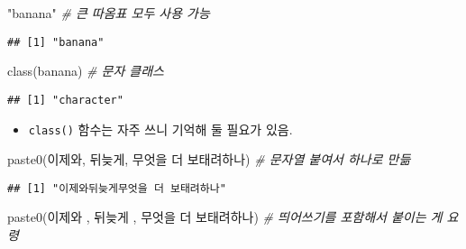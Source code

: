 \documentclass[
  12,
]{article}
\newenvironment{Shaded}{\begin{snugshade}}{\end{snugshade}}
\newcommand{\CommentTok}[1]{\textcolor[rgb]{0.56,0.35,0.01}{\textit{#1}}}
\newcommand{\FunctionTok}[1]{\textcolor[rgb]{0.00,0.00,0.00}{#1}}
\newcommand{\NormalTok}[1]{#1}
\newcommand{\StringTok}[1]{\textcolor[rgb]{0.31,0.60,0.02}{#1}}
\providecommand{\tightlist}{%
  \setlength{\itemsep}{0pt}\setlength{\parskip}{0pt}}
\begin{document}
\begin{Shaded}
\begin{Highlighting}[]
\StringTok{"banana"} \CommentTok{\# 큰 따옴표 모두 사용 가능}
\end{Highlighting}
\end{Shaded}

\begin{verbatim}
## [1] "banana"
\end{verbatim}

\begin{Shaded}
\begin{Highlighting}[]
\FunctionTok{class}\NormalTok{(}\StringTok{\textquotesingle{}banana\textquotesingle{}}\NormalTok{) }\CommentTok{\# 문자 클래스}
\end{Highlighting}
\end{Shaded}

\begin{verbatim}
## [1] "character"
\end{verbatim}

\begin{itemize}
\tightlist
\item
  \texttt{class()} 함수는 자주 쓰니 기억해 둘 필요가 있음.
\end{itemize}

\begin{Shaded}
\begin{Highlighting}[]
\FunctionTok{paste0}\NormalTok{(}\StringTok{\textquotesingle{}이제와\textquotesingle{}}\NormalTok{, }\StringTok{\textquotesingle{}뒤늦게\textquotesingle{}}\NormalTok{, }\StringTok{\textquotesingle{}무엇을 더 보태려하나\textquotesingle{}}\NormalTok{) }\CommentTok{\# 문자열 붙여서 하나로 만듦}
\end{Highlighting}
\end{Shaded}

\begin{verbatim}
## [1] "이제와뒤늦게무엇을 더 보태려하나"
\end{verbatim}

\begin{Shaded}
\begin{Highlighting}[]
\FunctionTok{paste0}\NormalTok{(}\StringTok{\textquotesingle{}이제와 \textquotesingle{}}\NormalTok{, }\StringTok{\textquotesingle{}뒤늦게 \textquotesingle{}}\NormalTok{, }\StringTok{\textquotesingle{}무엇을 더 보태려하나\textquotesingle{}}\NormalTok{) }\CommentTok{\# 띄어쓰기를 포함해서 붙이는 게 요령}
\end{Highlighting}
\end{Shaded}
\end{document}
